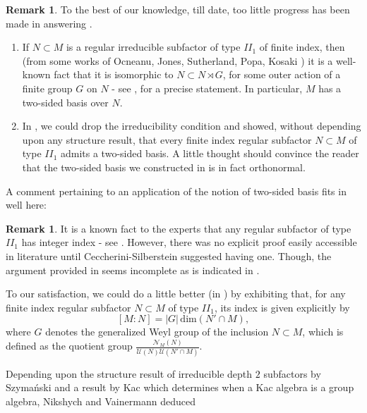 \documentclass{amsart}
\theoremstyle{definition}
\theoremstyle{theorem}
\newtheorem{remark}[theorem]{Remark}
\begin{document}
\begin{remark}
To the best of our knowledge, till date,  too little
progress has been made in answering . 

\begin{enumerate}
    \item If $N\subset M$ is a regular irreducible subfactor of type
      $II_1$ of finite index, then (from some works of Ocneanu, Jones,
      Sutherland, Popa, Kosaki ) it is a well-known fact that
      it is isomorphic to $N\subset N\rtimes G$, for some outer action
      of a finite group $G$ on $N$ - see \cite{H}, for a precise
      statement. In particular, $M$ has a two-sided basis over $N$.

    \item In \cite{BG}, we could drop the irreducibility condition and
      showed, without depending upon any structure result, that every
      finite index regular subfactor $N \subset M$ of type $II_1$
      admits a two-sided basis. A little thought should
        convince the reader that the two-sided basis we constructed in
        \cite{BG} is in fact orthonormal.
\end{enumerate}
\end{remark}
A comment pertaining to an application of the notion of two-sided basis
fits in well here:
\begin{remark}
 It is a known fact to the experts that any regular subfactor of type
 $II_1$ has integer index - see \cite[Page 150]{GHJ}. However, there
 was no explicit proof easily accessible in literature until
 Ceccherini-Silberstein \cite{S} suggested having one. Though, the
   argument provided in \cite[Theorem 4.5]{S} seems incomplete as is
   indicated in . \smallskip

 To our satisfaction, we could do a little better (in \cite{BG}) by
 exhibiting that, for any finite index regular subfactor $N \subset M$
 of type $II_1$, its index is given explicitly by
 \begin{equation}\label{dimn-formula}
[M:N] =|G|\, \mathrm{dim}(N'\cap M),
\end{equation}
where $G$ denotes the generalized Weyl group of the inclusion $N
\subset M$, which is defined as the quotient group
$\frac{\mathcal{N}_M(N)}{\mathcal{U}(N) \mathcal{U}(N'\cap
  M)}$.\smallskip
\end{remark}
 Depending upon the structure result of irreducible depth
$2$ subfactors by Szyma\'{n}ski and a result by Kac which determines
when a Kac algebra is a group algebra, Nikshych and Vainermann deduced
\end{document}
